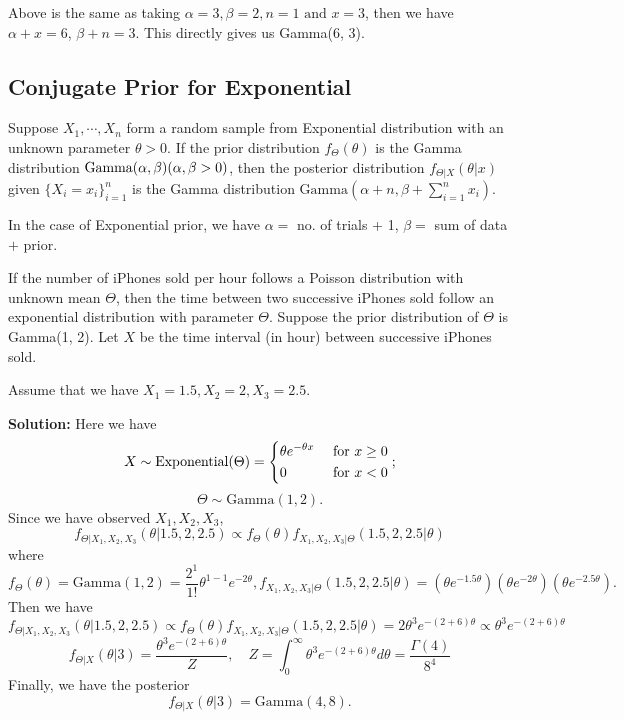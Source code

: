 Above is the same as taking \(\alpha = 3, \beta = 2, n = 1 \text{ and } x = 3\), then we have \(\alpha + x = 6\), \(\beta + n = 3\). This directly gives us Gamma(6, 3). 

\subsection{Conjugate Prior for Exponential}
\begin{definition}
  Suppose \(X_1, \cdots, X_n\) form a random sample from Exponential distribution with an unknown parameter \(\theta > 0\). If the prior distribution \(f_{\Theta}(\theta)\) is the Gamma distribution \(\text{Gamma}(\alpha, \beta)\\ (\alpha, \beta > 0)\), then the posterior distribution \(f_{\Theta \vert X} (\theta \vert x)\) given \(\{X_i = x_i\}_{i=1} ^n\) is the Gamma distribution \(\text{Gamma}(\alpha + n, \beta + \sum_{i = 1}^n x_i)\). 
\end{definition}

In the case of Exponential prior, we have \(\alpha =\) no. of trials + 1, \(\beta =\) sum of data \(+\) prior. 

\begin{eg}
  If the number of iPhones sold per hour follows a Poisson distribution with unknown mean \(\Theta\), then the time between two successive iPhones sold follow an exponential distribution with parameter \(\Theta\). Suppose the prior distribution of \(\Theta\) is Gamma(1, 2). Let \(X\) be the time interval (in hour) between successive iPhones sold.

  Assume that we have \(X_1 = 1.5, X_2 = 2, X_3 = 2.5\). 

  \textbf{Solution:} 
  Here we have 
  \[
    X \sim \text{Exponential}(\Theta) = \begin{dcases}
      \theta e^{-\theta x} &\text{ for } x \geq 0 \\
      0  &\text{ for } x < 0 \\ 
    \end{dcases};
  \]
  \[
    \Theta \sim \text{Gamma}(1, 2). 
  \]
  Since we have observed \(X_1, X_2, X_3\), 
  \[
    f_{\Theta \vert X_1, X_2, X_3} (\theta \vert 1.5, 2, 2.5) \propto f_{\Theta} (\theta) f_{X_1, X_2, X_3 \vert \Theta} (1.5, 2, 2.5 \vert \theta)
  \]
  where
  \[
    f_{\Theta} (\theta) = \text{Gamma}(1, 2) = \dfrac{2^1}{1!}\theta^{1-1}e^{-2\theta}, f_{X_1, X_2, X_3 \vert \Theta} (1.5, 2, 2.5 \vert \theta) = (\theta e^{-1.5\theta}) (\theta e^{-2\theta}) (\theta e^{-2.5\theta}). 
  \]
  Then we have
  \[
    f_{\Theta \vert X_1, X_2, X_3} (\theta \vert 1.5, 2, 2.5) \propto f_{\Theta} (\theta) f_{X_1, X_2, X_3 \vert \Theta} (1.5, 2, 2.5 \vert \theta) = 2\theta^3 e^{-(2 + 6)\theta} \propto \theta^3 e^{-(2 + 6)\theta}
  \]
  \[
    f_{\Theta \vert X} (\theta \vert 3) = \dfrac{\theta^3 e^{-(2 + 6)\theta}}{Z},\quad Z = \int_{0}^{\infty} \theta^3 e^{-(2 + 6)\theta} d \theta = \dfrac{\Gamma(4)}{8^4}
  \]
  Finally, we have the posterior
  \[
    f_{\Theta \vert X} (\theta \vert 3) = \text{Gamma}(4, 8). 
  \]
\end{eg}

